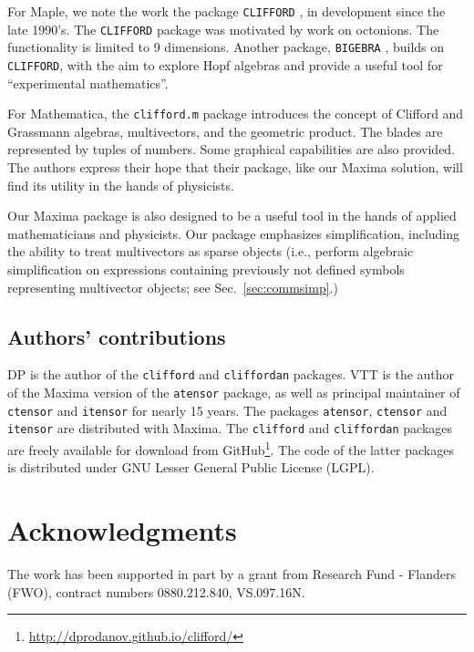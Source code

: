 \documentclass[twoside,reqno,11pt]{amsart}
\theoremstyle{definition}
\theoremstyle{remark}
\numberwithin{equation}{section}
\newcommand{\symb}[1]{{\tt #1}}
\begin{document}
For Maple, we note the work the package \symb{CLIFFORD} \cite{Ablamowicz2002}, in development since the late 1990's.
The \symb{CLIFFORD} package was motivated by work on octonions.
The functionality is limited to 9 dimensions.
 Another package, \symb{BIGEBRA} \cite{Ablamowicz2005}, builds on \symb{CLIFFORD}, with the aim to explore Hopf algebras and provide a useful tool for ``experimental mathematics''.

For Mathematica, the \symb{clifford.m} package \cite{Aragon-Camarasa2015} introduces the concept of Clifford and Grassmann algebras, multivectors, and the geometric product. The blades are represented by tuples of numbers.
Some graphical capabilities are also provided.
The authors express their hope that their package, like our Maxima solution, will find its utility in the hands of physicists.

Our Maxima package is also designed to be a useful tool in the hands of applied mathematicians and physicists. Our package emphasizes simplification, including the ability to treat multivectors as sparse objects (i.e., perform algebraic simplification on expressions containing previously not defined symbols representing multivector objects; see Sec.~\ref{sec:commsimp}.)

\subsection*{Authors' contributions}
\label{sec:contrib}

DP is the author of the \symb{clifford}  and \symb{cliffordan} packages. VTT is the author of the Maxima version of the \symb{atensor} package, as well as principal maintainer of \symb{ctensor} and \symb{itensor} for nearly 15 years. The packages \symb{atensor}, \symb{ctensor} and \symb{itensor} are distributed with Maxima. The \symb{clifford} and \symb{cliffordan} packages are freely available for download from GitHub\footnote{\url{http://dprodanov.github.io/clifford/}}. The code of the latter packages is distributed under GNU Lesser General Public License (LGPL).

\section*{Acknowledgments}
The work has been supported in part by a grant from Research Fund - Flanders (FWO), contract numbers
0880.212.840, VS.097.16N.



\end{document}
